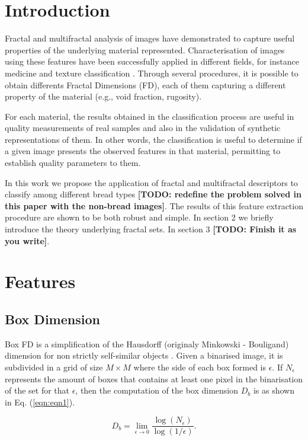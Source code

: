 \documentclass[oneside,a4paper,english,links]{amca}
\newcommand{\todo}[1]{\textbf{[TODO: #1]}}
\begin{document}
\section{Introduction}
Fractal and multifractal analysis of images have demonstrated to capture useful properties of the underlying material represented. Characterisation of images using these features have been successfully applied in different fields, for instance medicine \cite{Andjelkovic2008,Yu2011} and texture classification \cite{Wendt2009}. Through several procedures, it is possible to obtain differents Fractal Dimensions (FD), each of them capturing a different property of the material (e.g., void fraction, rugosity).

For each material, the results obtained in the classification process are useful in quality measurements of real samples and also in the validation of synthetic representations of them. In other words, the classification is useful to determine if a given image presents the observed features in that material, permitting to establish quality parameters to them.

In this work we propose the application of fractal and multifractal descriptors to classify among different bread types \todo{redefine the problem solved in this paper with the non-bread images}. The results of this feature extraction procedure are shown to be both robust and simple. In section 2 we briefly introduce the theory underlying fractal sets. In section 3 \todo{Finish it as you write}.

\section{Features}
\subsection{Box Dimension}
Box FD is a simplification of the Hausdorff (originaly Minkowski - Bouligand) dimension for non strictly self-similar objects \cite{Peitgen2004}. Given a binarised image, it is subdivided in a grid of size $M\times M$ where the side of each box formed is $\epsilon$. If $N_{\epsilon}$ represents the amount of boxes that contains at least one pixel in the binarisation of the set for that $\epsilon$, then the computation of the box dimension  $D_{b}$ is as shown in Eq. (\ref{eqn:eqn1}).

\begin{equation}
D_{b} = \displaystyle\lim_{\epsilon \to 0}{\frac{\log(N_{\epsilon})}{\log (1/\epsilon)}}.
\label{eqn:eqn1}
\end{equation}
\end{document}

